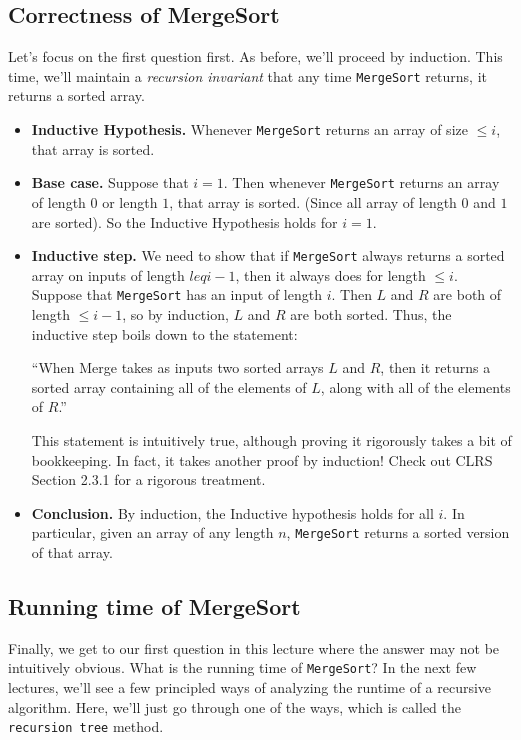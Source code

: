 \documentclass [12pt]{article}
\begin{document}
\subsection{Correctness of MergeSort}
Let's focus on the first question first. As before, we'll proceed by induction. This time, we'll maintain a \textit{recursion invariant} that any time \texttt{MergeSort} returns, it returns a sorted array.

\begin{itemize}
    \item \textbf{Inductive Hypothesis.} Whenever \texttt{MergeSort} returns an array of size $\leq i$, that array is sorted.
    \item \textbf{Base case.} Suppose that $i = 1$. Then whenever \texttt{MergeSort} returns an array of length $0$ or length $1$, that array is sorted. (Since all array of length $0$ and $1$ are sorted). So the Inductive Hypothesis holds for $i = 1$.
    \item \textbf{Inductive step.} We need to show that if \texttt{MergeSort} always returns a sorted array on inputs of length $leq i - 1$, then it always does for length $\leq i$. Suppose that \texttt{MergeSort} has an input of length $i$. Then $L$ and $R$ are both of length $\leq i - 1$, so by induction, $L$ and $R$ are both sorted. Thus, the inductive step boils down to the statement: 

    ``When Merge takes as inputs two sorted arrays $L$ and $R$, then it returns a sorted array containing all of the elements of $L$, along with all of the elements of $R$.''

    This statement is intuitively true, although proving it rigorously takes a bit of bookkeeping. In fact, it takes another proof by induction! Check out CLRS Section 2.3.1 for a rigorous treatment.
    \item \textbf{Conclusion.} By induction, the Inductive hypothesis holds for all $i$. In particular, given an array of any length $n$, \texttt{MergeSort} returns a sorted version of that array.
\end{itemize}

\subsection{Running time of MergeSort}
Finally, we get to our first question in this lecture where the answer may not be intuitively obvious. What is the running time of \texttt{MergeSort}? In the next few lectures, we'll see a few principled ways of analyzing the runtime of a recursive algorithm. Here, we'll just go through one of the ways, which is called the \texttt{recursion tree} method.
\end{document}
